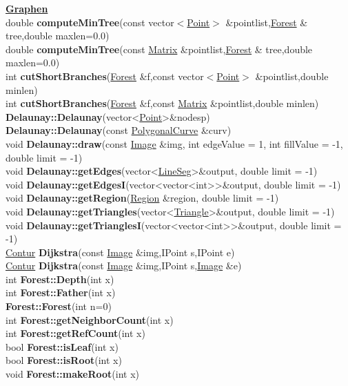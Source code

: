 \documentclass[10pt,titlepage]{article}
\newcommand{\subtitle}[1]{{\noindent\bf#1}}
\def\functionlistentry#1#2#3#4#5#6{\noindent #1 {\bf #2}(#3) \dotfill #6\\}
\begin{document}
{{\subtitle{\hyperlink{SECTION:graph}{Graphen}}\\
\functionlistentry{double}{computeMinTree}{const vector$<$\hyperlink{Point}{Point}$>$ \&pointlist,\hyperlink{Forest}{Forest} \& tree,double maxlen=0.0}{1295}{graph}{}
\functionlistentry{double}{computeMinTree}{const \hyperlink{Matrix}{Matrix} \&pointlist,\hyperlink{Forest}{Forest} \& tree,double maxlen=0.0}{1296}{graph}{}
\functionlistentry{int}{cutShortBranches}{\hyperlink{Forest}{Forest} \&f,const vector$<$\hyperlink{Point}{Point}$>$ \&pointlist,double minlen}{1298}{graph}{}
\functionlistentry{int}{cutShortBranches}{\hyperlink{Forest}{Forest} \&f,const \hyperlink{Matrix}{Matrix} \&pointlist,double minlen}{1299}{graph}{}
\functionlistentry{}{Delaunay::Delaunay}{vector\textless {}\hyperlink{Point}{Point}\textgreater  \&nodesp}{1302}{graph}{}
\functionlistentry{}{Delaunay::Delaunay}{const \hyperlink{PolygonalCurve}{PolygonalCurve} \&curv}{1303}{graph}{}
\functionlistentry{void}{Delaunay::draw}{const \hyperlink{Image}{Image} \&img, int edgeValue = 1, int fillValue = -1, double limit = -1}{1309}{graph}{}
\functionlistentry{void}{Delaunay::getEdges}{vector\textless {}\hyperlink{LineSeg}{LineSeg}\textgreater  \&output, double limit = -1}{1306}{graph}{}
\functionlistentry{void}{Delaunay::getEdgesI}{vector\textless {}vector\textless {}int\textgreater \textgreater  \&output, double limit = -1}{1307}{graph}{}
\functionlistentry{void}{Delaunay::getRegion}{\hyperlink{Region}{Region} \&region, double limit = -1}{1308}{graph}{}
\functionlistentry{void}{Delaunay::getTriangles}{vector\textless {}\hyperlink{Triangle}{Triangle}\textgreater  \&output, double limit = -1}{1304}{graph}{}
\functionlistentry{void}{Delaunay::getTrianglesI}{vector\textless {}vector\textless {}int\textgreater \textgreater  \&output, double limit = -1}{1305}{graph}{}
\functionlistentry{\hyperlink{Contur}{Contur}}{Dijkstra}{const \hyperlink{Image}{Image} \&img,IPoint s,IPoint e}{1300}{graph}{}
\functionlistentry{\hyperlink{Contur}{Contur}}{Dijkstra}{const \hyperlink{Image}{Image} \&img,IPoint s,\hyperlink{Image}{Image} \&e}{1301}{graph}{}
\functionlistentry{int}{Forest::Depth}{int x}{1288}{graph}{}
\functionlistentry{int}{Forest::Father}{int x}{1286}{graph}{}
\functionlistentry{}{Forest::Forest}{int n=0}{1276}{graph}{}
\functionlistentry{int}{Forest::getNeighborCount}{int x}{1281}{graph}{}
\functionlistentry{int}{Forest::getRefCount}{int x}{1280}{graph}{}
\functionlistentry{bool}{Forest::isLeaf}{int x}{1284}{graph}{}
\functionlistentry{bool}{Forest::isRoot}{int x}{1283}{graph}{}
\functionlistentry{void}{Forest::makeRoot}{int x}{1285}{graph}{}
}}
\end{document}
